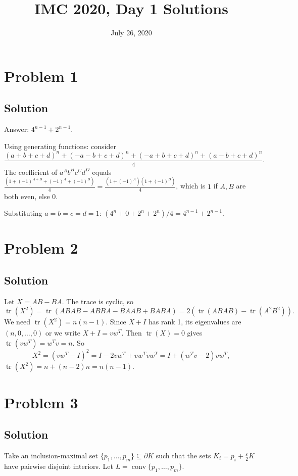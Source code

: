 \documentclass{article}
\title{IMC 2020, Day 1 Solutions}
\date{July 26, 2020}
\begin{document}
\maketitle

\section*{Problem 1}
\subsection*{Solution}
Answer: $4^{n-1} + 2^{n-1}$.

Using generating functions: consider
\[ \frac{(a+b+c+d)^n + (-a-b+c+d)^n + (-a+b+c+d)^n + (a-b+c+d)^n}{4}. \]
The coefficient of $a^A b^B c^C d^D$ equals $\frac{(1 + (-1)^{A+B} + (-1)^A + (-1)^B)}{4} = \frac{(1+(-1)^A)(1+(-1)^B)}{4}$, which is $1$ if $A, B$ are both even, else $0$.

Substituting $a = b = c = d = 1$: $(4^n + 0 + 2^n + 2^n)/4 = 4^{n-1} + 2^{n-1}$.

\section*{Problem 2}
\subsection*{Solution}
Let $X = AB - BA$. The trace is cyclic, so
\[ \operatorname{tr}(X^2) = \operatorname{tr}(ABAB - ABBA - BAAB + BABA) = 2(\operatorname{tr}(ABAB) - \operatorname{tr}(A^2 B^2)). \]
We need $\operatorname{tr}(X^2) = n(n-1)$. Since $X + I$ has rank 1, its eigenvalues are $(n, 0, \ldots, 0)$ or we write $X + I = vw^T$. Then $\operatorname{tr}(X) = 0$ gives $\operatorname{tr}(vw^T) = w^T v = n$. So
\[ X^2 = (vw^T - I)^2 = I - 2vw^T + vw^T v w^T = I + (w^T v - 2) vw^T, \]
$\operatorname{tr}(X^2) = n + (n-2) n = n(n-1)$.

\section*{Problem 3}
\subsection*{Solution}
Take an inclusion-maximal set $\{p_1, \ldots, p_m\} \subseteq \partial K$ such that the sets $K_i = p_i + \tfrac{\varepsilon}{2} K$ have pairwise disjoint interiors. Let $L = \operatorname{conv}\{p_1, \ldots, p_m\}$.
\end{document}
